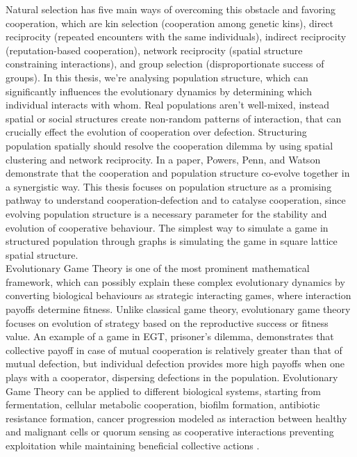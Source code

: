 \documentclass{article}
\begin{document}
Natural selection has five main ways of overcoming this obstacle and favoring cooperation, which are kin selection (cooperation among genetic kins), direct reciprocity (repeated encounters with the same individuals), indirect reciprocity (reputation-based cooperation), network reciprocity (spatial structure constraining interactions), and group selection (disproportionate success of groups).
In this thesis, we're analysing population structure, which can significantly influences the evolutionary dynamics by determining which individual interacts with whom. Real populations aren't well-mixed, instead spatial or social structures create non-random patterns of interaction, that can crucially effect the evolution of cooperation over defection. Structuring population spatially should resolve the cooperation dilemma by using spatial clustering and network reciprocity\citep{Nowak2010}. 
In a paper, Powers, Penn, and Watson demonstrate that the cooperation and population structure co-evolve together in a synergistic way\citep{Powers2011}.
This thesis focuses on population structure as a promising pathway to understand cooperation-defection and to catalyse cooperation, since evolving population structure is a necessary parameter for the stability and evolution of cooperative behaviour. The simplest way to simulate a game in structured population through graphs is simulating the game in square lattice spatial structure.\\
Evolutionary Game Theory is one of the most prominent mathematical framework, which can possibly explain these complex evolutionary dynamics by converting biological behaviours as strategic interacting games, where interaction payoffs determine fitness. Unlike classical game theory, evolutionary game theory focuses on evolution of strategy based on the reproductive success or fitness value. An example of a game in EGT, prisoner's dilemma, demonstrates that collective payoff in case of mutual cooperation is relatively greater than that of mutual defection, but individual defection provides more high payoffs when one plays with a cooperator, dispersing defections in the population.
Evolutionary Game Theory can be applied to different biological systems, starting from fermentation, cellular metabolic cooperation, biofilm formation, antibiotic resistance formation, cancer progression modeled as interaction between healthy and malignant cells or quorum sensing as cooperative interactions preventing exploitation while maintaining beneficial collective actions \citep{Hummert2014}.\\
\end{document}

